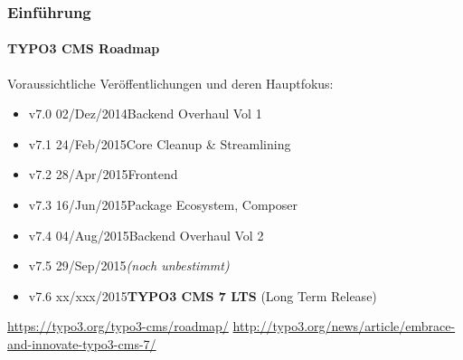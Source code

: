 \begin{frame}[fragile]
	\frametitle{Einführung}
	\framesubtitle{TYPO3 CMS Roadmap}

	Voraussichtliche Veröffentlichungen und deren Hauptfokus:

	\begin{itemize}
		\item v7.0 \tabto{1.0cm}02/Dez/2014\tabto{3.4cm}Backend Overhaul Vol 1
		\item v7.1 \tabto{1.0cm}24/Feb/2015\tabto{3.4cm}Core Cleanup \& Streamlining
		\item v7.2 \tabto{1.0cm}28/Apr/2015\tabto{3.4cm}Frontend
		\item v7.3 \tabto{1.0cm}16/Jun/2015\tabto{3.4cm}Package Ecosystem, Composer

		\item
			\begingroup
				\color{typo3orange}
					v7.4 \tabto{1.0cm}04/Aug/2015\tabto{3.4cm}Backend Overhaul Vol 2
			\endgroup

		\item v7.5 \tabto{1.0cm}29/Sep/2015\tabto{3.4cm}\textit{(noch unbestimmt)}
		\item v7.6 \tabto{1.0cm}xx/xxx/2015\tabto{3.4cm}\textbf{TYPO3 CMS 7 LTS} (Long Term Release)
	\end{itemize}

	\smaller
		\url{https://typo3.org/typo3-cms/roadmap/}\newline
		\url{http://typo3.org/news/article/embrace-and-innovate-typo3-cms-7/}
	\normalsize

\end{frame}

